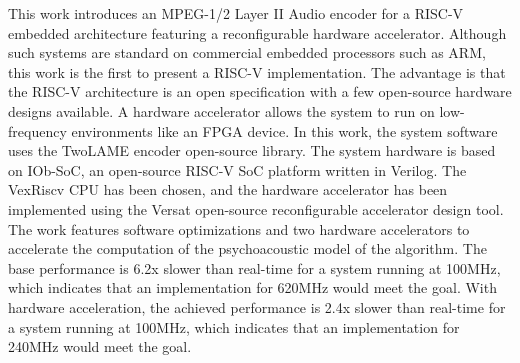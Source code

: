 \hspace{0.4cm} This work introduces an MPEG-1/2 Layer II Audio encoder for a RISC-V embedded architecture featuring a reconfigurable hardware accelerator. Although such systems are standard on commercial embedded processors such as ARM, this work is the first to present a RISC-V implementation. The advantage is that the RISC-V architecture is an open specification with a few open-source hardware designs available. A hardware accelerator allows the system to run on low-frequency environments like an FPGA device. In this work, the system software uses the TwoLAME encoder open-source library. The system hardware is based on IOb-SoC, an open-source RISC-V SoC platform written in Verilog. The VexRiscv CPU has been chosen, and the hardware accelerator has been implemented using the Versat open-source reconfigurable accelerator design tool. The work features software optimizations and two hardware accelerators to accelerate the computation of the psychoacoustic model of the algorithm. The base performance is 6.2x slower than real-time for a system running at 100MHz, which indicates that an implementation for 620MHz would meet the goal. With hardware acceleration, the achieved performance is 2.4x slower than real-time for a system running at 100MHz, which indicates that an implementation for 240MHz would meet the goal.